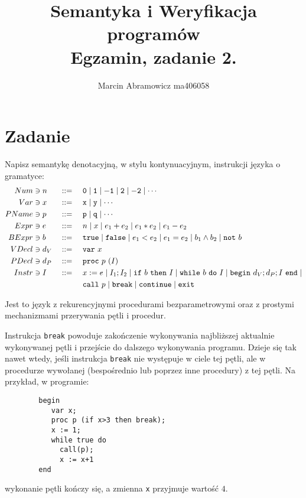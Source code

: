\documentclass{article}
\title{
   Semantyka i Weryfikacja programów \\
   \large Egzamin, zadanie 2.
}
\author{Marcin Abramowicz ma406058}
\begin{document}
   \maketitle

   \section{Zadanie}

   Napisz semantykę denotacyjną, w stylu kontynuacyjnym, instrukcji języka o gramatyce:
   \begin{alignat*}{4}
      Num &\ni n & & ::= &\ & {\tt 0} \mid{\tt 1} \mid {\tt -1} \mid {\tt 2} \mid {\tt -2} \mid \cdots \\
      Var &\ni x && ::= && {\tt x}\mid {\tt y}\mid \cdots \\
      PName &\ni p & & ::= && {\tt p}\mid {\tt q}\mid \cdots \\
      Expr &\ni e && ::= && n \mid x \mid e_1+e_2 \mid e_1*e_2 \mid e_1-e_2 \\
      BExpr &\ni b && ::= && {\tt true} \mid {\tt false} \mid e_1<e_2 \mid e_1=e_2 \mid b_1\land b_2 \mid {\tt not}\ b\\
      VDecl &\ni d_V && ::= && {\tt var}\ x \\
      PDecl &\ni d_P && ::= && {\tt proc}\ p\ (I) \\
      Instr &\ni I && ::= && x := e \mid I_1;I_2 \mid {\tt if}\ b\ {\tt then}\ I \mid {\tt while}\ b\ {\tt do}\ I \mid {\tt begin}\ d_V; d_P;  I\ {\tt end} \mid \\
      &&&&& {\tt call}\ p \mid {\tt break} \mid {\tt continue} \mid {\tt exit} %
   \end{alignat*}

   Jest to język z rekurencyjnymi procedurami bezparametrowymi oraz z prostymi mechanizmami przerywania pętli i procedur.

   Instrukcja {\tt break} powoduje zakończenie wykonywania najbliższej aktualnie wykonywanej pętli i przejście do dalszego wykonywania programu. Dzieje się tak nawet wtedy, jeśli instrukcja {\tt break} nie występuje w ciele tej pętli, ale w procedurze wywołanej (bespośrednio lub poprzez inne procedury) z tej pętli. Na przykład, w programie:
   \begin{verbatim}
        begin
           var x;
           proc p (if x>3 then break);
           x := 1;
           while true do
             call(p);
             x := x+1
        end
   \end{verbatim}
   wykonanie pętli kończy się, a zmienna {\tt x} przyjmuje wartość $4$.
\end{document}
